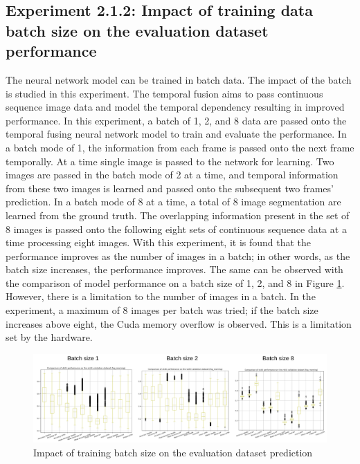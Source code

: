 	\subsection{Experiment 2.1.2: Impact of training data batch size on the evaluation dataset performance}
	
	The neural network model can be trained in batch data. The impact of the batch is studied in this experiment. The temporal fusion aims to pass continuous sequence image data and model the temporal dependency resulting in improved performance. In this experiment, a batch of 1, 2, and 8 data are passed onto the temporal fusing neural network model to train and evaluate the performance. In a batch mode of 1, the information from each frame is passed onto the next frame temporally. At a time single image is passed to the network for learning. Two images are passed in the batch mode of 2 at a time, and temporal information from these two images is learned and passed onto the subsequent two frames' prediction. In a batch mode of 8 at a time, a total of 8 image segmentation are learned from the ground truth. The overlapping information present in the set of 8 images is passed onto the following eight sets of continuous sequence data at a time processing eight images. With this experiment, it is found that the performance improves as the number of images in a batch; in other words, as the batch size increases, the performance improves. The same can be observed with the comparison of model performance on a batch size of 1, 2, and 8 in Figure \ref{fig:batch_wise_performance}. However, there is a limitation to the number of images in a batch. In the experiment, a maximum of 8 images per batch was tried; if the batch size increases above eight, the Cuda memory overflow is observed. This is a limitation set by the hardware. 

	\begin{figure}
		\centering
		\includegraphics[width=16cm]{images/batch_wise_performance_comparison.png}
		\caption{Impact of training batch size on the evaluation dataset prediction}
		\label{fig:batch_wise_performance}
	\end{figure}		    
	
